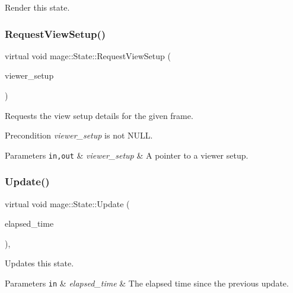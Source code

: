 Render this state. \hypertarget{classmage_1_1_state_a352431f7b9c067bc45f922b782d6b407}{}\label{classmage_1_1_state_a352431f7b9c067bc45f922b782d6b407} 
\subsubsection{\texorpdfstring{Request\+View\+Setup()}{RequestViewSetup()}}
{\footnotesize\ttfamily virtual void mage\+::\+State\+::\+Request\+View\+Setup (\begin{DoxyParamCaption}\item[{\hyperlink{structmage_1_1_viewer_setup}{Viewer\+Setup} $\ast$}]{viewer\+\_\+setup }\end{DoxyParamCaption})\hspace{0.3cm}{\ttfamily [virtual]}}

Requests the view setup details for the given frame.

\begin{DoxyPrecond}{Precondition}
{\itshape viewer\+\_\+setup} is not {\ttfamily N\+U\+LL}. 
\end{DoxyPrecond}

\begin{DoxyParams}[1]{Parameters}
\mbox{\tt in,out}  & {\em viewer\+\_\+setup} & A pointer to a viewer setup. \\
\hline
\end{DoxyParams}
\hypertarget{classmage_1_1_state_afbee8caa84e0c69ac5757f7e5e87317f}{}\label{classmage_1_1_state_afbee8caa84e0c69ac5757f7e5e87317f} 
\subsubsection{\texorpdfstring{Update()}{Update()}}
{\footnotesize\ttfamily virtual void mage\+::\+State\+::\+Update (\begin{DoxyParamCaption}\item[{double}]{elapsed\+\_\+time }\end{DoxyParamCaption})\hspace{0.3cm}{\ttfamily [protected]}, {\ttfamily [virtual]}}

Updates this state.


\begin{DoxyParams}[1]{Parameters}
\mbox{\tt in}  & {\em elapsed\+\_\+time} & The elapsed time since the previous update. \\
\hline
\end{DoxyParams}


